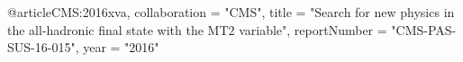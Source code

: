 @article{CMS:2016xva,
    collaboration = "CMS",
    title = "{Search for new physics in the all-hadronic final state with the MT2 variable}",
    reportNumber = "CMS-PAS-SUS-16-015",
    year = "2016"
}

